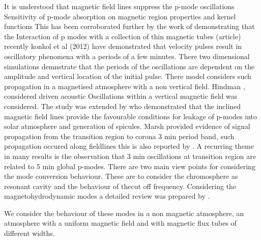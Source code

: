 \documentclass{aa}
\begin{document}
It is understood that magnetic field lines suppress the p-mode oscillations \cite{Gascoyne2011} Sensitivity of p-mode absorption on magnetic region properties and kernel functions This has been corroborated further by the work of \cite{Jain2011} demonstrating that the Interaction of p modes with a collection of thin magnetic tubes (article) recently konkol et al (2012)  \cite{Konkol2012} have demonstrated that velocity pulses result in oscillatory phenomena with a periods of a few minutes. There two dimensional simulations demnstrate that the periods of the oscillations are dependent on the  amplitude and vertical location of the initial pulse. There model considers such propagation in a magnetised atmosphere with a non vertical field. Hindman  \cite{Hindman1996}, considered driven acoustic Oscillations within a vertical magnetic field  was considered. The study was extended by \cite{James2003} who demonstrated that the inclined magnetic field lines provide the favourable conditions for leakage of p-modes into solar atmosphere and generation of spicules. Marsh \cite{Marsh2006} provided evidence of signal propagation from the transition region to corona 3 min period band, such propagation occured along fieldlines this is also reported by \cite{Zhukov2002}. A recurring theme in many results is the observation that 3 min oscillations at transition region are related to 5 min global p-modes. There are two main view points for considering the mode conversion behaviour. These are to consider the chromosphere as resonant cavity and the behaviour of thecut off frequency. Considering the magnetohydrodynamic modes  a detailed review was prepared by \cite{Khomenko2013}. 

 We consider the behaviour of these modes in a non magnetic atmosphere, an atmosphere with a uniform magnetic field and with magnetic flux tubes of different widths.




\end{document}
